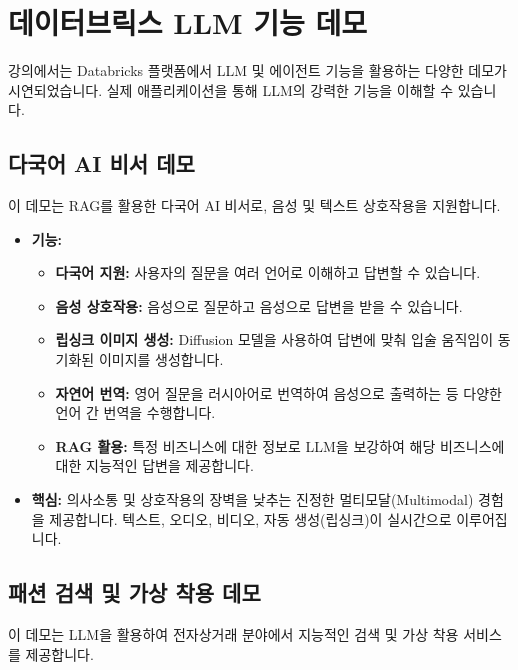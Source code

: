 \documentclass[11pt,a4paper]{article}
\theoremstyle{definition}
\begin{document}
\newpage
\section{데이터브릭스 LLM 기능 데모}

강의에서는 Databricks 플랫폼에서 LLM 및 에이전트 기능을 활용하는 다양한 데모가 시연되었습니다. 실제 애플리케이션을 통해 LLM의 강력한 기능을 이해할 수 있습니다.

\subsection{다국어 AI 비서 데모}

이 데모는 RAG를 활용한 다국어 AI 비서로, 음성 및 텍스트 상호작용을 지원합니다.

\begin{itemize}
    \item \textbf{기능:}
    \begin{itemize}
        \item \textbf{다국어 지원:} 사용자의 질문을 여러 언어로 이해하고 답변할 수 있습니다.
        \item \textbf{음성 상호작용:} 음성으로 질문하고 음성으로 답변을 받을 수 있습니다.
        \item \textbf{립싱크 이미지 생성:} Diffusion 모델을 사용하여 답변에 맞춰 입술 움직임이 동기화된 이미지를 생성합니다.
        \item \textbf{자연어 번역:} 영어 질문을 러시아어로 번역하여 음성으로 출력하는 등 다양한 언어 간 번역을 수행합니다.
        \item \textbf{RAG 활용:} 특정 비즈니스에 대한 정보로 LLM을 보강하여 해당 비즈니스에 대한 지능적인 답변을 제공합니다.
    \end{itemize}
    \item \textbf{핵심:} 의사소통 및 상호작용의 장벽을 낮추는 진정한 멀티모달(Multimodal) 경험을 제공합니다. 텍스트, 오디오, 비디오, 자동 생성(립싱크)이 실시간으로 이루어집니다.
\end{itemize}

\subsection{패션 검색 및 가상 착용 데모}

이 데모는 LLM을 활용하여 전자상거래 분야에서 지능적인 검색 및 가상 착용 서비스를 제공합니다.
\end{document}
